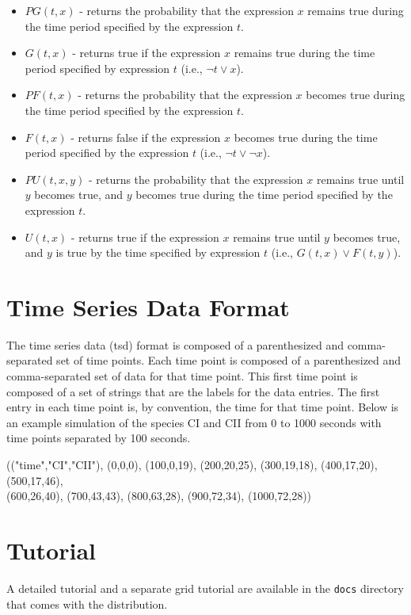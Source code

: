 \documentclass[titlepage,11pt]{article}
\begin{document}
\begin{itemize}
\item $PG(t,x)$ - returns the probability that the expression $x$ remains true during the time period specified by the expression $t$.
\item $G(t,x)$ - returns true if the expression $x$ remains true during the time period specified by expression $t$ (i.e., $\neg t \vee x$). 
\item $PF(t,x)$ - returns the probability that the expression $x$ becomes true during the time period specified by the expression $t$.
\item $F(t,x)$ - returns false if the expression $x$ becomes true during the time period specified by the expression $t$ (i.e., $\neg t \vee \neg x$). 
\item $PU(t,x,y)$ - returns the probability that the expression $x$ remains true until $y$ becomes true, and $y$ becomes true during the time period specified by the expression $t$.
\item $U(t,x)$ - returns true if the expression $x$ remains true until $y$ becomes true, and $y$ is true by the time specified by expression $t$ (i.e., $G(t,x) \vee F(t,y)$). 
\end{itemize}

\section{\label{TSD}Time Series Data Format}

\noindent
The time series data (tsd) format is composed of a parenthesized and comma-separated set of time points. Each time point is composed of a parenthesized and comma-separated set of data for that time point. This first time point is composed of a set of strings that are the labels for the data entries. The first entry in each time point is, by convention, the time for that time point. Below is an example simulation of the species CI and CII from 0 to 1000 seconds with time points separated by 100 seconds. 

(("time","CI","CII"), (0,0,0), (100,0,19), (200,20,25), (300,19,18), (400,17,20), (500,17,46), \\
(600,26,40), (700,43,43), (800,63,28), (900,72,34), (1000,72,28))

\section{Tutorial}

\noindent
A detailed 
tutorial
and a separate
grid tutorial
are available in the {\tt docs} directory that comes with the distribution.
\end{document}
